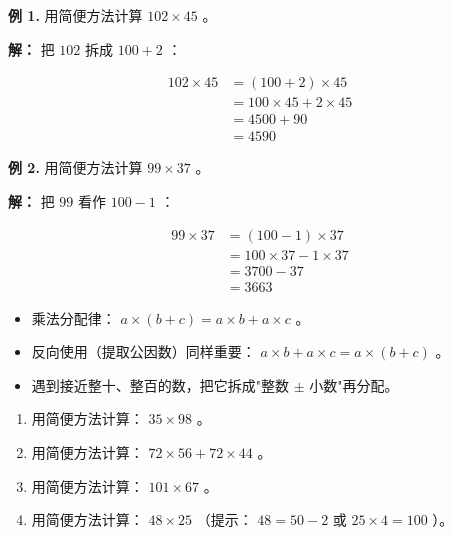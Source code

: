 \begin{workedexamples}


\textbf{例 1.} 用简便方法计算 $102 \times 45$ 。

\textbf{解：} 把 $102$ 拆成 $100 + 2$ ：

\[
\begin{aligned}
102 \times 45 &= (100 + 2) \times 45 \\
&= 100 \times 45 + 2 \times 45 \\
&= 4500 + 90 \\
&= 4590
\end{aligned}
\]


\textbf{例 2.} 用简便方法计算 $99 \times 37$ 。

\textbf{解：} 把 $99$ 看作 $100 - 1$ ：

\[
\begin{aligned}
99 \times 37 &= (100 - 1) \times 37 \\
&= 100 \times 37 - 1 \times 37 \\
&= 3700 - 37 \\
&= 3663
\end{aligned}
\]


\end{workedexamples}

\begin{keytakeaway}


\begin{itemize}
  \item 乘法分配律： $a \times (b + c) = a \times b + a \times c$ 。
  \item 反向使用（提取公因数）同样重要： $a \times b + a \times c = a \times (b + c)$ 。
  \item 遇到接近整十、整百的数，把它拆成"整数 $\pm$ 小数"再分配。
\end{itemize}


\end{keytakeaway}

\begin{practice}


\begin{enumerate}
  \item 用简便方法计算： $35 \times 98$ 。
  \item 用简便方法计算： $72 \times 56 + 72 \times 44$ 。
  \item 用简便方法计算： $101 \times 67$ 。
  \item 用简便方法计算： $48 \times 25$ （提示： $48 = 50 - 2$ 或 $25 \times 4 = 100$ ）。
\end{enumerate}


\end{practice}



